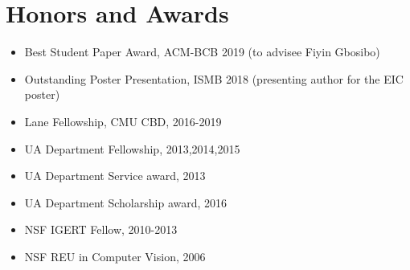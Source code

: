 \documentclass[10pt,letterpaper]{article}
\begin{document}
\section*{Honors and Awards}

\begin{itemize}
    \item Best Student Paper Award, ACM-BCB 2019 (to advisee Fiyin Gbosibo)
    \item Outstanding Poster Presentation, ISMB 2018 (presenting author for the EIC poster)
    \item Lane Fellowship, CMU CBD, 2016-2019
    \item UA Department Fellowship, 2013,2014,2015
    \item UA Department Service award, 2013
    \item UA Department Scholarship award, 2016
    \item NSF IGERT Fellow, 2010-2013
    \item NSF REU in Computer Vision, 2006
\end{itemize}
\end{document}
